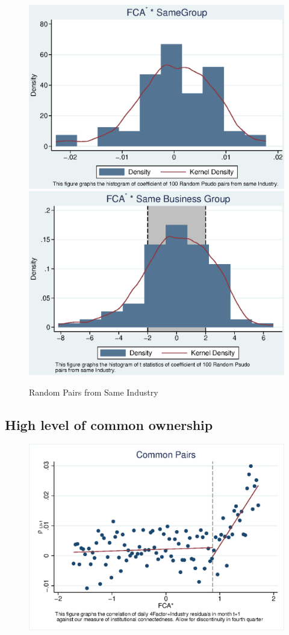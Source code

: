 \documentclass[12pt, a4paper]{article}
\begin{document}
		


		\begin{figure}
			\centering
			\caption{Random Pairs from Same Industry}
			\includegraphics[width=0.45\linewidth]{IndustryPseudoSBFCA.eps}	
			\includegraphics[width=0.45\linewidth]{IndustryPseudoSBFCA_t.eps}
		\end{figure}




\FloatBarrier










\subsection{High level of common ownership}

 \begin{figure}[htbp]
 \centering  
\includegraphics[width=0.8\linewidth]{"Qmcorr5lrd.eps"}
\end{figure}
\end{document}
